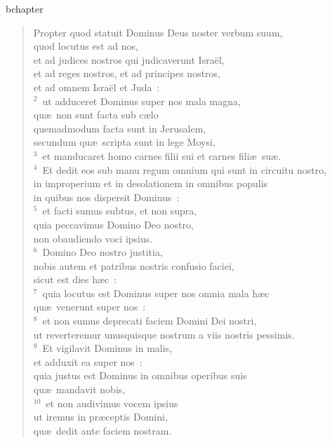 bchapter\begin{verse}\vspace{-19pt}Propter quod statuit Dominus Deus noster verbum suum,\\ quod locutus est ad nos,\\ et ad judices nostros qui judicaverunt Isra\"el,\\ et ad reges nostros, et ad principes nostros,\\ et ad omnem Isra\"el et Juda~:\\
${}^{2}$~ut adduceret Dominus super nos mala magna,\\ qu\ae\ non sunt facta sub c\ae lo\\ quemadmodum facta sunt in Jerusalem,\\ secundum qu\ae\ scripta sunt in lege Moysi,\\
${}^{3}$~et manducaret homo carnes filii sui et carnes fili\ae\ su\ae .\\
${}^{4}$~Et dedit eos sub manu regum omnium qui sunt in circuitu nostro,\\ in improperium et in desolationem in omnibus populis\\ in quibus nos dispersit Dominus~:\\
${}^{5}$~et facti sumus subtus, et non supra,\\ quia peccavimus Domino Deo nostro,\\ non obaudiendo voci ipsius.\\
${}^{6}$~Domino Deo nostro justitia,\\ nobis autem et patribus nostris confusio faciei,\\ sicut est dies h\ae c~:\\
${}^{7}$~quia locutus est Dominus super nos omnia mala h\ae c\\ qu\ae\ venerunt super nos~:\\
${}^{8}$~et non sumus deprecati faciem Domini Dei nostri,\\ ut reverteremur unusquisque nostrum a viis nostris pessimis.\\
${}^{9}$~Et vigilavit Dominus in malis,\\ et adduxit ea super nos~:\\ quia justus est Dominus in omnibus operibus suis\\ qu\ae\ mandavit nobis,\\
${}^{10}$~et non audivimus vocem ipsius\\ ut iremus in pr\ae ceptis Domini,\\ qu\ae\ dedit ante faciem nostram.\end{verse}


